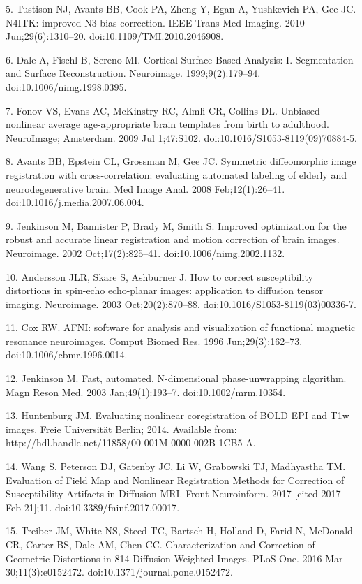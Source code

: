 5. Tustison NJ, Avants BB, Cook PA, Zheng Y, Egan A, Yushkevich PA, Gee JC. N4ITK: improved N3 bias correction. IEEE Trans Med Imaging. 2010 Jun;29(6):1310–20. doi:10.1109/TMI.2010.2046908.

6. Dale A, Fischl B, Sereno MI. Cortical Surface-Based Analysis: I. Segmentation and Surface Reconstruction. Neuroimage. 1999;9(2):179–94. doi:10.1006/nimg.1998.0395.

7. Fonov VS, Evans AC, McKinstry RC, Almli CR, Collins DL. Unbiased nonlinear average age-appropriate brain templates from birth to adulthood. NeuroImage; Amsterdam. 2009 Jul 1;47:S102. doi:10.1016/S1053-8119(09)70884-5.

8. Avants BB, Epstein CL, Grossman M, Gee JC. Symmetric diffeomorphic image registration with cross-correlation: evaluating automated labeling of elderly and neurodegenerative brain. Med Image Anal. 2008 Feb;12(1):26–41. doi:10.1016/j.media.2007.06.004.

9. Jenkinson M, Bannister P, Brady M, Smith S. Improved optimization for the robust and accurate linear registration and motion correction of brain images. Neuroimage. 2002 Oct;17(2):825–41. doi:10.1006/nimg.2002.1132.

10. Andersson JLR, Skare S, Ashburner J. How to correct susceptibility distortions in spin-echo echo-planar images: application to diffusion tensor imaging. Neuroimage. 2003 Oct;20(2):870–88. doi:10.1016/S1053-8119(03)00336-7.

11. Cox RW. AFNI: software for analysis and visualization of functional magnetic resonance neuroimages. Comput Biomed Res. 1996 Jun;29(3):162–73. doi:10.1006/cbmr.1996.0014.

12. Jenkinson M. Fast, automated, N-dimensional phase-unwrapping algorithm. Magn Reson Med. 2003 Jan;49(1):193–7. doi:10.1002/mrm.10354.

13. Huntenburg JM. Evaluating nonlinear coregistration of BOLD EPI and T1w images. Freie Universität Berlin; 2014. Available from: http://hdl.handle.net/11858/00-001M-0000-002B-1CB5-A.

14. Wang S, Peterson DJ, Gatenby JC, Li W, Grabowski TJ, Madhyastha TM. Evaluation of Field Map and Nonlinear Registration Methods for Correction of Susceptibility Artifacts in Diffusion MRI. Front Neuroinform. 2017 [cited 2017 Feb 21];11. doi:10.3389/fninf.2017.00017.

15. Treiber JM, White NS, Steed TC, Bartsch H, Holland D, Farid N, McDonald CR, Carter BS, Dale AM, Chen CC. Characterization and Correction of Geometric Distortions in 814 Diffusion Weighted Images. PLoS One. 2016 Mar 30;11(3):e0152472. doi:10.1371/journal.pone.0152472.

